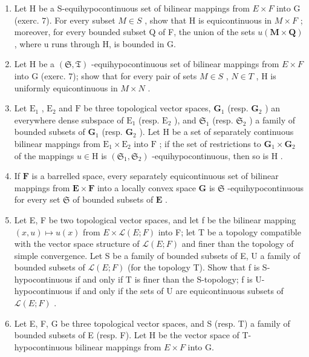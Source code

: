 \begin{enumerate}
\def\labelenumi{\arabic{enumi})}
\setcounter{enumi}{7}
\item
  Let H be a S-equihypocontinuous set of bilinear mappings from \(E \times F\) into G (exerc. 7). For every subset \(M \in S\) , show that H is equicontinuous in \(M \times F\) ; moreover, for every bounded subset Q of F, the union of the sets \(u(\mathbf{M} \times \mathbf{Q})\) , where u runs through H, is bounded in G.
\item
  Let H be a \((\mathfrak{S}, \mathfrak{T})\) -equihypocontinuous set of bilinear mappings from \(E \times F\) into G (exerc. 7); show that for every pair of sets \(M \in S\) , \(N \in T\) , H is uniformly equicontinuous in \(M \times N\) .
\item
  Let \(\mathrm{E}_1\) , \(\mathrm{E}_2\) and \(\mathrm{F}\) be three topological vector spaces, \(\mathbf{G}_1\) (resp. \(\mathbf{G}_2\) ) an everywhere dense subspace of \(\mathrm{E}_1\) (resp. \(\mathrm{E}_2\) ), and \(\mathfrak{S}_1\) (resp. \(\mathfrak{S}_2\) ) a family of bounded subsets of \(\mathbf{G}_1\) (resp. \(\mathbf{G}_2\) ). Let \(\mathrm{H}\) be a set of separately continuous bilinear mappings from \(\mathrm{E}_1 \times \mathrm{E}_2\) into \(\mathrm{F}\) ; if the set of restrictions to \(\mathbf{G}_1 \times \mathbf{G}_2\) of the mappings \(u \in \mathrm{H}\) is \((\mathfrak{S}_1, \mathfrak{S}_2)\) -equihypocontinuous, then so is \(\mathrm{H}\) .
\item
  If \(\mathbf{F}\) is a barrelled space, every separately equicontinuous set of bilinear mappings from \(\mathbf{E} \times \mathbf{F}\) into a locally convex space \(\mathbf{G}\) is \(\mathfrak{S}\) -equihypocontinuous for every set \(\mathfrak{S}\) of bounded subsets of \(\mathbf{E}\) .
\item
  Let E, F be two topological vector spaces, and let f be the bilinear mapping \((x, u) \mapsto u(x)\) from \(E \times \mathcal{L}(E; F)\) into F; let T be a topology compatible with the vector space structure of \(\mathcal{L}(E; F)\) and finer than the topology of simple convergence. Let S be a family of bounded subsets of E, U a family of bounded subsets of \(\mathcal{L}(E; F)\) (for the topology T). Show that f is S-hypocontinuous if and only if T is finer than the S-topology; f is U-hypocontinuous if and only if the sets of U are equicontinuous subsets of \(\mathcal{L}(E; F)\) .
\item
  Let E, F, G be three topological vector spaces, and S (resp. T) a family of bounded subsets of E (resp. F). Let H be the vector space of T-hypocontinuous bilinear mappings from \(E \times F\) into G.
\end{enumerate}

